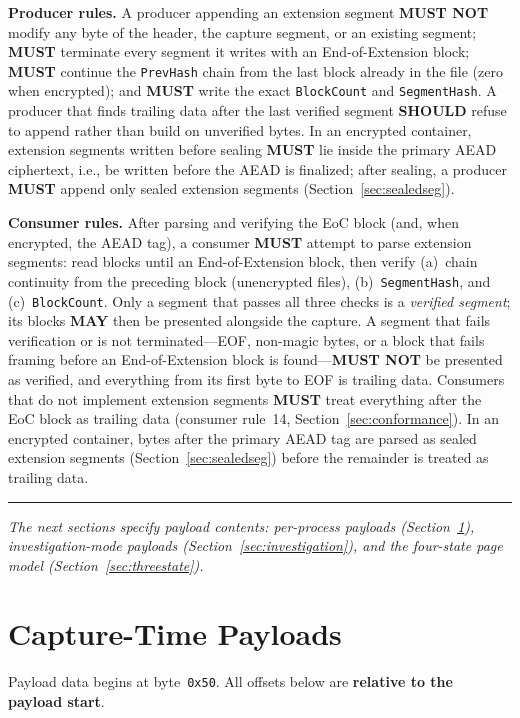 \documentclass[11pt,a4paper]{article}
\newcommand{\MUST}{\textbf{MUST}}
\newcommand{\MUSTNOT}{\textbf{MUST NOT}}
\newcommand{\SHOULD}{\textbf{SHOULD}}
\newcommand{\MAY}{\textbf{MAY}}
\newcommand{\hex}[1]{\texttt{0x#1}}
\newcommand{\field}[1]{\texttt{#1}}
\begin{document}
\noindent\textbf{Producer rules.} A producer appending an extension segment \MUSTNOT{} modify any byte of the header, the capture segment, or an existing segment; \MUST{} terminate every segment it writes with an End-of-Extension block; \MUST{} continue the \field{PrevHash} chain from the last block already in the file (zero when encrypted); and \MUST{} write the exact \field{BlockCount} and \field{SegmentHash}. A producer that finds trailing data after the last verified segment \SHOULD{} refuse to append rather than build on unverified bytes. In an encrypted container, extension segments written before sealing \MUST{} lie inside the primary AEAD ciphertext, i.e., be written before the AEAD is finalized; after sealing, a producer \MUST{} append only sealed extension segments (Section~\ref{sec:sealedseg}).

\noindent\textbf{Consumer rules.} After parsing and verifying the EoC block (and, when encrypted, the AEAD tag), a consumer \MUST{} attempt to parse extension segments: read blocks until an End-of-Extension block, then verify (a)~chain continuity from the preceding block (unencrypted files), (b)~\field{SegmentHash}, and (c)~\field{BlockCount}. Only a segment that passes all three checks is a \emph{verified segment}; its blocks \MAY{} then be presented alongside the capture. A segment that fails verification or is not terminated---EOF, non-magic bytes, or a block that fails framing before an End-of-Extension block is found---\MUSTNOT{} be presented as verified, and everything from its first byte to EOF is trailing data. Consumers that do not implement extension segments \MUST{} treat everything after the EoC block as trailing data (consumer rule~14, Section~\ref{sec:conformance}). In an encrypted container, bytes after the primary AEAD tag are parsed as sealed extension segments (Section~\ref{sec:sealedseg}) before the remainder is treated as trailing data.

\vspace{0.5em}\noindent\rule{\textwidth}{0.3pt}\vspace{0.5em}
\noindent\textit{The next sections specify payload contents: per-process payloads (Section~\ref{sec:payloads}), investigation-mode payloads (Section~\ref{sec:investigation}), and the four-state page model (Section~\ref{sec:threestate}).}

\newpage
\section{Capture-Time Payloads}\label{sec:payloads}
Payload data begins at byte~\hex{50}. All offsets below are \textbf{relative to the payload start}.
\end{document}
